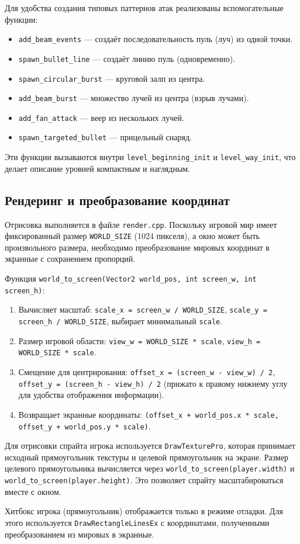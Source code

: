 \documentclass[../main.tex]{subfiles}
\begin{document}
Для удобства создания типовых паттернов атак реализованы вспомогательные функции:
\begin{itemize}
	\item \texttt{add\_beam\_events} — создаёт последовательность пуль (луч) из одной точки.
	\item \texttt{spawn\_bullet\_line} — создаёт линию пуль (одновременно).
	\item \texttt{spawn\_circular\_burst} — круговой залп из центра.
	\item \texttt{add\_beam\_burst} — множество лучей из центра (взрыв лучами).
	\item \texttt{add\_fan\_attack} — веер из нескольких лучей.
	\item \texttt{spawn\_targeted\_bullet} — прицельный снаряд.
\end{itemize}

Эти функции вызываются внутри \texttt{level\_beginning\_init} и \texttt{level\_way\_init}, что делает описание уровней компактным и наглядным.

\subsection{Рендеринг и преобразование координат}

Отрисовка выполняется в файле \texttt{render.cpp}. Поскольку игровой мир имеет фиксированный размер \texttt{WORLD\_SIZE} (1024 пикселя), а окно может быть произвольного размера, необходимо преобразование мировых координат в экранные с сохранением пропорций.

Функция \texttt{world\_to\_screen(Vector2 world\_pos, int screen\_w, int screen\_h)}:
\begin{enumerate}
	\item Вычисляет масштаб: \texttt{scale\_x = screen\_w / WORLD\_SIZE}, \texttt{scale\_y = screen\_h / WORLD\_SIZE}, выбирает минимальный \texttt{scale}.
	\item Размер игровой области: \texttt{view\_w = WORLD\_SIZE * scale}, \texttt{view\_h = WORLD\_SIZE * scale}.
	\item Смещение для центрирования: \texttt{offset\_x = (screen\_w - view\_w) / 2}, \texttt{offset\_y = (screen\_h - view\_h) / 2} (прижато к правому нижнему углу для удобства отображения информации).
	\item Возвращает экранные координаты: \texttt{(offset\_x + world\_pos.x * scale, offset\_y + world\_pos.y * scale)}.
\end{enumerate}

Для отрисовки спрайта игрока используется \texttt{DrawTexturePro}, которая принимает исходный прямоугольник текстуры и целевой прямоугольник на экране. Размер целевого прямоугольника вычисляется через \texttt{world\_to\_screen(player.width)} и \\ \texttt{world\_to\_screen(player.height)}. Это позволяет спрайту масштабироваться вместе с окном.

Хитбокс игрока (прямоугольник) отображается только в режиме отладки. Для этого используется \texttt{DrawRectangleLinesEx} с координатами, полученными преобразованием из мировых в экранные.
\end{document}
